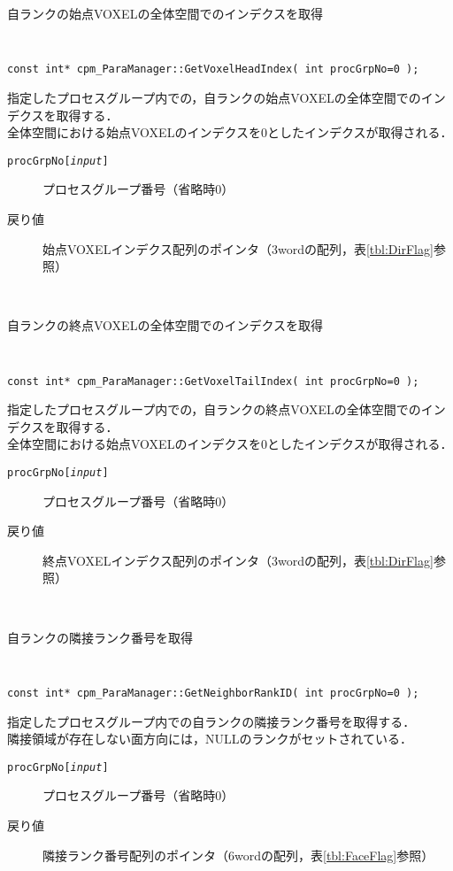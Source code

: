 \begin{spacing}{0.8}
\begin{itembox}[l]{自ランクの始点VOXELの全体空間でのインデクスを取得}
{\tt
\begin{verbatim}
const int* cpm_ParaManager::GetVoxelHeadIndex( int procGrpNo=0 );
\end{verbatim}
}
指定したプロセスグループ内での，自ランクの始点VOXELの全体空間でのインデクスを取得する．\\
全体空間における始点VOXELのインデクスを0としたインデクスが取得される．
\begin{description}
\item[{\tt procGrpNo[{\it input}]}] プロセスグループ番号（省略時0）
\\
\item[戻り値]始点VOXELインデクス配列のポインタ（3wordの配列，表\ref{tbl:DirFlag}参照）
\end{description}
\end{itembox}\\
\end{spacing}

\begin{spacing}{0.8}
\begin{itembox}[l]{自ランクの終点VOXELの全体空間でのインデクスを取得}
{\tt
\begin{verbatim}
const int* cpm_ParaManager::GetVoxelTailIndex( int procGrpNo=0 );
\end{verbatim}
}
指定したプロセスグループ内での，自ランクの終点VOXELの全体空間でのインデクスを取得する．\\
全体空間における始点VOXELのインデクスを0としたインデクスが取得される．
\begin{description}
\item[{\tt procGrpNo[{\it input}]}] プロセスグループ番号（省略時0）
\\
\item[戻り値]終点VOXELインデクス配列のポインタ（3wordの配列，表\ref{tbl:DirFlag}参照）
\end{description}
\end{itembox}\\
\end{spacing}

\begin{spacing}{0.8}
\begin{itembox}[l]{自ランクの隣接ランク番号を取得}
{\tt
\begin{verbatim}
const int* cpm_ParaManager::GetNeighborRankID( int procGrpNo=0 );
\end{verbatim}
}
指定したプロセスグループ内での自ランクの隣接ランク番号を取得する．\\
隣接領域が存在しない面方向には，NULLのランクがセットされている．
\begin{description}
\item[{\tt procGrpNo[{\it input}]}] プロセスグループ番号（省略時0）
\\
\item[戻り値]隣接ランク番号配列のポインタ（6wordの配列，表\ref{tbl:FaceFlag}参照）
\end{description}
\end{itembox}\\
\end{spacing}

